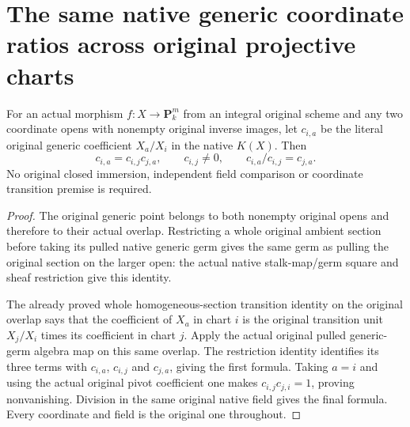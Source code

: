 \section{The same native generic coordinate ratios across original projective charts}
\label{sec:projective-chart-generic-transitions}

\begin{theorem}
\label{thm:projective-chart-generic-transitions}
\leanok
{}
For an actual morphism $f:X\to\mathbf P^m_k$ from an integral original
scheme and any two coordinate opens with nonempty original inverse
images, let $c_{i,a}$ be the literal original generic coefficient
$X_a/X_i$ in the native $K(X)$. Then
\[
 c_{i,a}=c_{i,j}c_{j,a},\qquad c_{i,j}\ne0,
 \qquad c_{i,a}/c_{i,j}=c_{j,a}.
\]
No original closed immersion, independent field comparison or coordinate
transition premise is required.
\end{theorem}
\begin{proof}
The original generic point belongs to both nonempty original opens and
therefore to their actual overlap. Restricting a whole original ambient
section before taking its pulled native generic germ gives the same
germ as pulling the original section on the larger open: the actual
native stalk-map/germ square and sheaf restriction give this identity.

The already proved whole homogeneous-section transition identity on
the original overlap says that the coefficient of $X_a$ in chart $i$
is the original transition unit $X_j/X_i$ times its coefficient in
chart $j$. Apply the actual original pulled generic-germ algebra map
on this same overlap. The restriction identity identifies its three
terms with $c_{i,a}$, $c_{i,j}$ and $c_{j,a}$, giving the first formula.
Taking $a=i$ and using the actual original pivot coefficient one makes
$c_{i,j}c_{j,i}=1$, proving nonvanishing. Division in the same original
native field gives the final formula. Every coordinate and field is
the original one throughout.
\end{proof}
